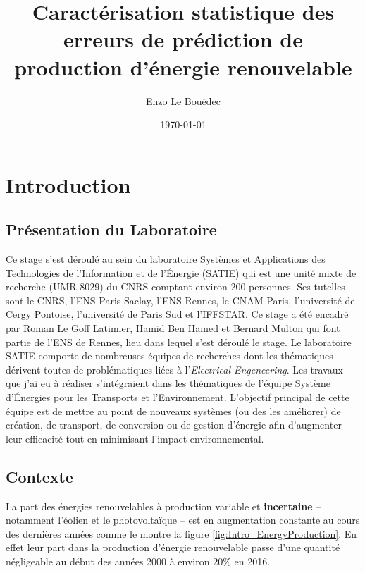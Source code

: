 \documentclass[12pt]{report}
\title{Caractérisation statistique des erreurs de prédiction de production d'énergie renouvelable}
\author{Enzo Le Bouëdec}
\date{\today}
\begin{document}
\maketitle
\tableofcontents

\printnomenclature

\chapter{Introduction}
\section{Présentation du Laboratoire}
Ce stage s'est déroulé au sein du laboratoire Systèmes et Applications des Technologies de l'Information et de l'Énergie (SATIE) qui est une unité mixte de recherche (UMR 8029) du CNRS comptant environ 200 personnes. Ses tutelles sont le CNRS, l'ENS Paris Saclay, l'ENS Rennes, le CNAM Paris, l'université de Cergy Pontoise, l'université de Paris Sud et l'IFFSTAR. Ce stage a été encadré par Roman Le Goff Latimier, Hamid Ben Hamed et Bernard Multon qui font partie de l'ENS de Rennes, lieu dans lequel s'est déroulé le stage. Le laboratoire SATIE comporte de nombreuses équipes de recherches dont les thématiques dérivent toutes de problématiques liées à l'\textit{Electrical Engeneering}. Les travaux que j'ai eu à réaliser s'intégraient dans les thématiques de l'équipe Système d'Énergies pour les Transports et l'Environnement. L'objectif principal de cette équipe est de mettre au point de nouveaux systèmes (ou des les améliorer) de création, de transport, de conversion ou de gestion d'énergie afin d'augmenter leur efficacité tout en minimisant l'impact environnemental.

\section{Contexte}

La part des énergies renouvelables à production variable et \textbf{incertaine} -- notamment l'éolien et le photovoltaïque -- est en augmentation constante au cours des dernières années comme le montre la figure \ref{fig:Intro_EnergyProduction}. En effet leur part dans la production d'énergie renouvelable passe d'une quantité négligeable au début des années 2000 à environ $20 \%$ en 2016.
\end{document}
